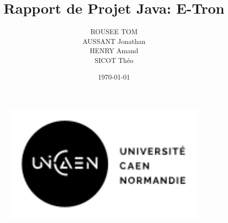 \documentclass{myClass}
\title{Rapport de Projet Java: E-Tron}
\author{ROUSEE TOM \\ AUSSANT Jonathan \\ HENRY Amand \\ SICOT Théo}
\date{\today}
\begin{document}
\begin{figure}
	\centering
	
		\includegraphics[width=0.9\textwidth]{images/2020_UNICAEN_LOGO_isotype-signature_horizontal_noir.png}
	
	\label{fig:game}
\end{figure}

\maketitle

\pagebreak

\tableofcontents



\nocite{*}

 
\end{document}
